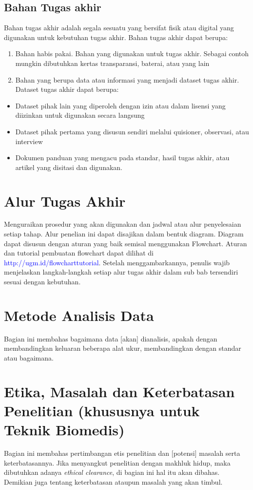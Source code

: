 \subsection*{Bahan Tugas akhir}

Bahan tugas akhir adalah segala sesuatu yang bersifat fisik atau digital yang digunakan untuk kebutuhan tugas akhir. Bahan tugas akhir dapat berupa:

\begin{enumerate}
\item Bahan habis pakai. Bahan yang digunakan untuk tugas akhir. Sebagai contoh 
mungkin dibutuhkan kertas transparansi, baterai, atau yang lain 
\item Bahan yang berupa data atau informasi yang menjadi dataset tugas akhir. Dataset tugas akhir dapat berupa:
\end{enumerate}
	\begin{itemize}
	\item Dataset pihak lain yang diperoleh dengan izin atau dalam lisensi yang diizinkan untuk digunakan secara langsung 
	\item Dataset pihak pertama yang disusun sendiri melalui quisioner, observasi, atau interview 
	\item Dokumen panduan yang mengacu pada standar, hasil tugas akhir, atau artikel yang disitasi dan digunakan.
	\end{itemize}

\section{Alur Tugas Akhir}

Menguraikan prosedur yang akan digunakan dan jadwal atau alur penyelesaian setiap 
tahap. Alur penelian ini dapat disajikan dalam bentuk diagram. Diagram dapat disusun dengan aturan yang baik semisal menggunakan Flowchart. Aturan dan tutorial pembuatan flowchart dapat dilihat di \textcolor{blue}{http://ugm.id/flowcharttutorial}. Setelah menggambarkannya, penulis wajib menjelaskan langkah-langkah setiap alur tugas akhir dalam sub bab tersendiri sesuai dengan kebutuhan.

\section{Metode Analisis Data}

Bagian ini membahas bagaimana data [akan] dianalisis, apakah dengan membandingkan 
keluaran beberapa alat ukur, membandingkan dengan standar atau bagaimana.

\section{Etika, Masalah dan Keterbatasan Penelitian (khususnya untuk Teknik Biomedis)}

Bagian ini membahas pertimbangan etis penelitian dan [potensi] masalah serta
keterbatasannya. Jika menyangkut penelitian dengan makhluk hidup, maka dibutuhkan adanya \textit{ethical clearance}, di bagian ini hal itu akan dibahas. Demikian juga tentang keterbatasan ataupun masalah yang akan timbul.
